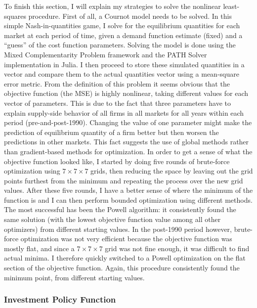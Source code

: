 \documentclass[12pt]{article}
\begin{document}
To finish this section, I will explain my strategies to solve the nonlinear least-squares procedure. First of all, a Cournot model needs to be solved. In this simple Nash-in-quantities game, I solve for the equilibrium quantities for each market at each period of time, given a demand function estimate (fixed) and a ``guess'' of the cost function parameters. Solving the model is done using the Mixed Complementarity Problem framework and the PATH Solver implementation in Julia. I then proceed to store these simulated quantities in a vector and compare them to the actual quantities vector using a mean-square error metric. From the definition of this problem it seems obvious that the objective function (the MSE) is highly nonlinear, taking different values for each vector of parameters. This is due to the fact that three parameters have to explain supply-side behavior of all firms in all markets for all years within each period (pre-and-post-1990). Changing the value of one parameter might make the prediction of equilibrium quantity of a firm better but then worsen the predictions in other markets. This fact suggests the use of global methods rather than gradient-based methods for optimization. In order to get a sense of what the objective function looked like, I started by doing five rounds of brute-force optimization using $7\times 7\times 7$ grids, then reducing the space by leaving out the grid points furthest from the minimum and repeating the process over the new grid values. After these five rounds, I have a better sense of where the minimum of the function is and I can then perform bounded optimization using different methods. The most successful has been the Powell algorithm: it consistently found the same solution (with the lowest objective function value among all other optimizers) from different starting values. In the post-1990 period however, brute-force optimization was not very efficient because the objective function was mostly flat, and since a $7\times 7\times 7$ grid was not fine enough, it was difficult to find actual minima. I therefore quickly switched to a Powell optimization on the flat section of the objective function. Again, this procedure consistently found the minimum point, from different starting values.

\subsubsection{Investment Policy Function}
\end{document}
